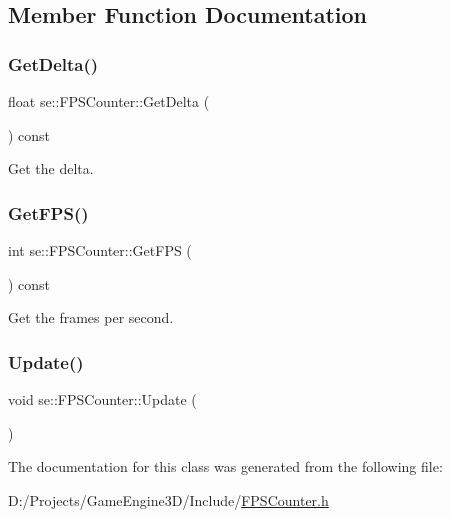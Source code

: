 \subsection{Member Function Documentation}
\mbox{\label{classse_1_1_f_p_s_counter_ac39be1bd1ff3954813d6d5733825abb1}} 
\subsubsection{\texorpdfstring{Get\+Delta()}{GetDelta()}}
{\footnotesize\ttfamily float se\+::\+F\+P\+S\+Counter\+::\+Get\+Delta (\begin{DoxyParamCaption}{ }\end{DoxyParamCaption}) const}

Get the delta. \mbox{\label{classse_1_1_f_p_s_counter_a6e3fc56e01f9696ce549264f6246fa01}} 
\subsubsection{\texorpdfstring{Get\+F\+P\+S()}{GetFPS()}}
{\footnotesize\ttfamily int se\+::\+F\+P\+S\+Counter\+::\+Get\+F\+PS (\begin{DoxyParamCaption}{ }\end{DoxyParamCaption}) const}

Get the frames per second. \mbox{\label{classse_1_1_f_p_s_counter_a863da58355d25fcf9f76b9cc697101e4}} 
\subsubsection{\texorpdfstring{Update()}{Update()}}
{\footnotesize\ttfamily void se\+::\+F\+P\+S\+Counter\+::\+Update (\begin{DoxyParamCaption}{ }\end{DoxyParamCaption})}



The documentation for this class was generated from the following file\+:\begin{DoxyCompactItemize}
\item 
D\+:/\+Projects/\+Game\+Engine3\+D/\+Include/\mbox{\hyperlink{_f_p_s_counter_8h}{F\+P\+S\+Counter.\+h}}\end{DoxyCompactItemize}
